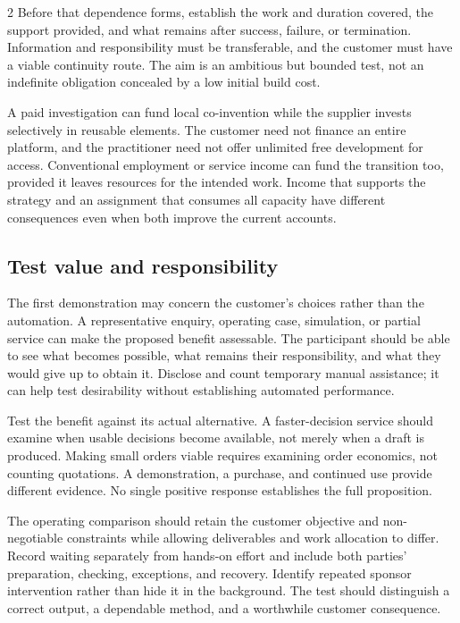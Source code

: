 \begin{multicols}{2}
Before that dependence forms, establish the work and duration covered,
the support provided, and what remains after success, failure, or
termination. Information and responsibility must be transferable, and
the customer must have a viable continuity route. The aim is an
ambitious but bounded test, not an indefinite obligation concealed by a
low initial build cost.

A paid investigation can fund local co-invention while the supplier
invests selectively in reusable elements. The customer need not finance
an entire platform, and the practitioner need not offer unlimited free
development for access. Conventional employment or service income can
fund the transition too, provided it leaves resources for the intended
work. Income that supports the strategy and an assignment that consumes
all capacity have different consequences even when both improve the
current accounts.

\subsection{Test value and
responsibility}\label{test-value-and-responsibility}

The first demonstration may concern the customer's choices rather than
the automation. A representative enquiry, operating case, simulation, or
partial service can make the proposed benefit assessable. The
participant should be able to see what becomes possible, what remains
their responsibility, and what they would give up to obtain it. Disclose
and count temporary manual assistance; it can help test desirability
without establishing automated performance.

Test the benefit against its actual alternative. A faster-decision
service should examine when usable decisions become available, not
merely when a draft is produced. Making small orders viable requires
examining order economics, not counting quotations. A demonstration, a
purchase, and continued use provide different evidence. No single
positive response establishes the full proposition.

The operating comparison should retain the customer objective and
non-negotiable constraints while allowing deliverables and work
allocation to differ. Record waiting separately from hands-on effort and
include both parties' preparation, checking, exceptions, and recovery.
Identify repeated sponsor intervention rather than hide it in the
background. The test should distinguish a correct output, a dependable
method, and a worthwhile customer consequence.


\end{multicols}
